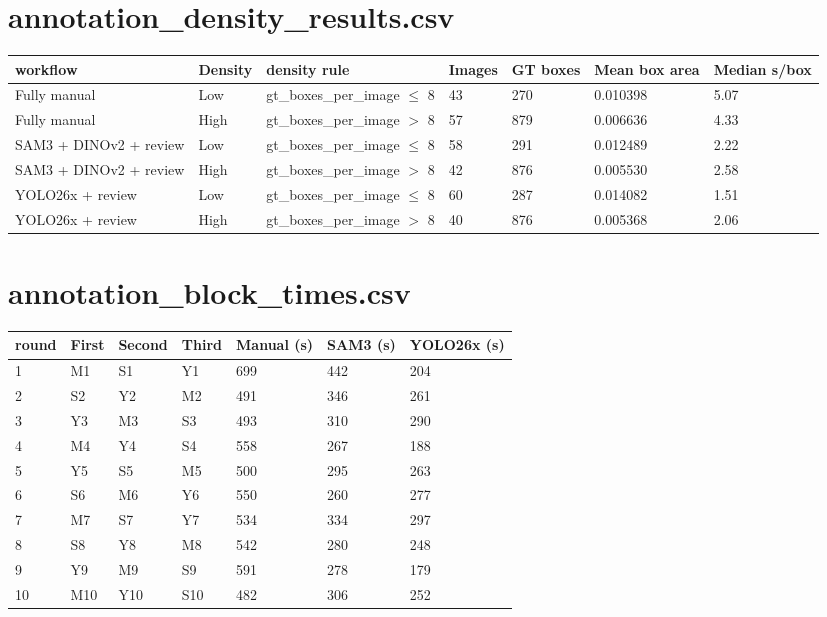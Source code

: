 \documentclass{article}
\begin{document}
\section*{annotation\_density\_results.csv}
\begin{lrbox}{\resulttable}\begin{tabular}{lllllll}
\toprule
workflow & Density & density rule & Images & GT boxes & Mean box area & Median s/box \\
\midrule
Fully manual & Low & gt\_boxes\_per\_image \(\leq\) 8 & 43 & 270 & 0.010398 & 5.07 \\
Fully manual & High & gt\_boxes\_per\_image \(>\) 8 & 57 & 879 & 0.006636 & 4.33 \\
SAM3 + DINOv2 + review & Low & gt\_boxes\_per\_image \(\leq\) 8 & 58 & 291 & 0.012489 & 2.22 \\
SAM3 + DINOv2 + review & High & gt\_boxes\_per\_image \(>\) 8 & 42 & 876 & 0.005530 & 2.58 \\
YOLO26x + review & Low & gt\_boxes\_per\_image \(\leq\) 8 & 60 & 287 & 0.014082 & 1.51 \\
YOLO26x + review & High & gt\_boxes\_per\_image \(>\) 8 & 40 & 876 & 0.005368 & 2.06 \\
\bottomrule
\end{tabular}\end{lrbox}
\noindent\ifdim\wd\resulttable>\linewidth\resizebox{.99\linewidth}{!}{\usebox{\resulttable}}\else\usebox{\resulttable}\fi
\clearpage
\section*{annotation\_block\_times.csv}
\begin{lrbox}{\resulttable}\begin{tabular}{lllllll}
\toprule
round & First & Second & Third & Manual (s) & SAM3 (s) & YOLO26x (s) \\
\midrule
1 & M1 & S1 & Y1 & 699 & 442 & 204 \\
2 & S2 & Y2 & M2 & 491 & 346 & 261 \\
3 & Y3 & M3 & S3 & 493 & 310 & 290 \\
4 & M4 & Y4 & S4 & 558 & 267 & 188 \\
5 & Y5 & S5 & M5 & 500 & 295 & 263 \\
6 & S6 & M6 & Y6 & 550 & 260 & 277 \\
7 & M7 & S7 & Y7 & 534 & 334 & 297 \\
8 & S8 & Y8 & M8 & 542 & 280 & 248 \\
9 & Y9 & M9 & S9 & 591 & 278 & 179 \\
10 & M10 & Y10 & S10 & 482 & 306 & 252 \\
\bottomrule
\end{tabular}\end{lrbox}
\noindent\ifdim\wd\resulttable>\linewidth\resizebox{.99\linewidth}{!}{\usebox{\resulttable}}\else\usebox{\resulttable}\fi
\clearpage
\end{document}
